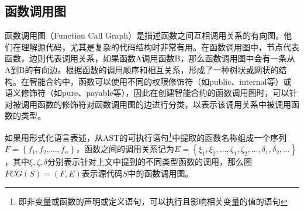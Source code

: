 \subsection{函数调用图}
\label{sec:函数调用图}
函数调用图（Function Call Graph）是描述函数之间互相调用关系的有向图。他们在理解源代码，尤其是复杂的代码结构时非常有用。在函数调用图中，节点代表函数，边则代表调用关系，如果函数A调用函数B，那么函数调用图中会有一条从A到B的有向边。根据函数的调用顺序和相互关系，形成了一种树状或网状的结构。在智能合约中，函数可以使用不同的权限修饰符（如public、internal等）或语义修饰符（如pure、payable等），因此在创建智能合约的函数调用图时，可以针对被调用函数的修饰符对函数调用图的边进行分类，以表示该调用关系中被调用函数的类型。

如果用形式化语言表述，从AST的可执行语句\footnote{即非变量或函数的声明或定义语句，可以执行且影响相关变量的值的语句}中提取的函数名称组成一个序列$F=\left\{f_1, f_2, \ldots, f_n\right\}$，函数之间的调用关系记为$E=\left\{\xi_1, \xi_2, \ldots, \zeta_1, \zeta_2, \ldots, \delta_1, \delta_2, \ldots\right\}$，其中$\xi, \zeta, \delta$分别表示针对上文中提到的不同类型函数的调用，那么图$FCG(S)=(F, E)$表示源代码$S$中的函数调用图。%


